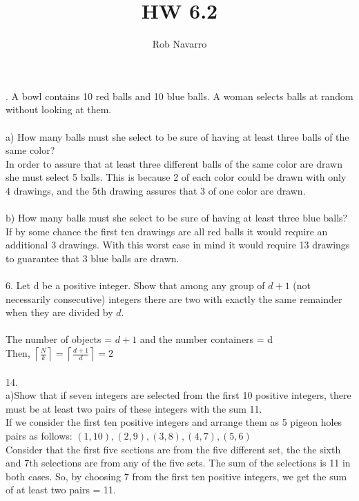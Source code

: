 \documentclass[11pt, oneside]{article}   	%
\title{HW 6.2}
\author{Rob Navarro}
\def\lc{\left\lceil}
\def\rc{\right\rceil}
\begin{document}
\maketitle

.  A bowl contains 10 red balls and 10 blue balls. A woman selects balls at random without looking at them.\\\\
a) How many balls must she select to be sure of having at least three balls of the same color?\\
In order to assure that at least three different balls of the same color are drawn she must select 5 balls. This is because 2 of each color could be drawn with only 4 drawings, and the 5th drawing assures that 3 of one color are drawn.\\\\
b) How many balls must she select to be sure of having at least three blue balls?\\
If by some chance the first ten drawings are all red balls it would require an additional 3 drawings. With this worst case in mind it would require 13 drawings to guarantee that 3 blue balls are drawn. \\\\
6. Let d be a positive integer. Show that among any group of $d + 1$ (not necessarily consecutive) integers there are two with exactly the same remainder when they are divided by $d$.\\\\
The number of objects = $d + 1$ and the number containers = d\\
Then, $\lc\frac{N}{k}\rc = \lc\frac{d+1}{d}\rc = 2$\\\\
14. \\
a)Show that if seven integers are selected from the first 10 positive integers, there must be at least two pairs of these integers with the sum 11.\\
If we consider the first ten positive integers and arrange them as 5 pigeon holes pairs as follows:
$(1,10), (2,9), (3,8), (4,7), (5,6)$\\
Consider that the first five sections are from the five different set, the the sixth and 7th selections are from any of the five sets. The sum of the selections is 11 in both cases.  So, by choosing 7 from the first ten positive integers, we get the sum of at least two pairs = 11. \\\\
\end{document}
